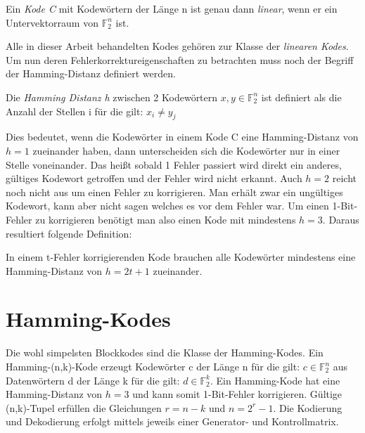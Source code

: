 \begin{t_def}
Ein {\em Kode C} mit Kodewörtern der Länge n ist genau dann {\em linear}, wenn er ein Untervektorraum von $\mathbb{F}_{2}^{n}$ ist.
\end{t_def}

Alle in dieser Arbeit behandelten Kodes gehören zur Klasse der \textit{linearen Kodes}.\cite[Kap. 1.2]{huffman2010fundamentals} Um nun deren Fehlerkorrektureigenschaften zu betrachten muss noch der Begriff der Hamming-Distanz definiert werden.

\begin{t_def}
Die {\em Hamming Distanz h} zwischen 2 Kodewörtern $x,y \in \mathbb{F}_{2}^{n}$ ist definiert als die Anzahl der Stellen i für die gilt: $x_i \neq y_j$
\end{t_def}

Dies bedeutet, wenn die Kodewörter in einem Kode C eine Hamming-Distanz von $h=1$ zueinander haben, dann unterscheiden sich die Kodewörter nur in einer Stelle voneinander. Das heißt sobald 1 Fehler passiert wird direkt ein anderes, gültiges Kodewort getroffen und der Fehler wird nicht erkannt. Auch $h=2$ reicht noch nicht aus um einen Fehler zu korrigieren. Man erhält zwar ein ungültiges Kodewort, kann aber nicht sagen welches es vor dem Fehler war. Um einen 1-Bit-Fehler zu korrigieren benötigt man also einen Kode mit mindestens $h=3$.\cite[Kap. 1.4]{huffman2010fundamentals} Daraus resultiert folgende Definition:

\begin{t_def}
In einem t-Fehler korrigierenden Kode brauchen alle Kodewörter mindestens eine Hamming-Distanz von $h=2t+1$ zueinander.
\end{t_def}


\section{Hamming-Kodes}
\label{section:hamming}

Die wohl simpelsten Blockkodes sind die Klasse der Hamming-Kodes. Ein Hamming-(n,k)-Kode erzeugt Kodewörter c der Länge n für die gilt: $c \in \mathbb{F}_{2}^{n}$ aus Datenwörtern d der Länge k für die gilt: $d \in \mathbb{F}_{2}^{k}$. Ein Hamming-Kode hat eine Hamming-Distanz von $h=3$ und kann somit 1-Bit-Fehler korrigieren. Gültige (n,k)-Tupel erfüllen die Gleichungen $r = n - k$ und $n = 2^r - 1$.\cite[Kap. 1.8]{huffman2010fundamentals} Die Kodierung und Dekodierung erfolgt mittels jeweils einer Generator- und Kontrollmatrix.

